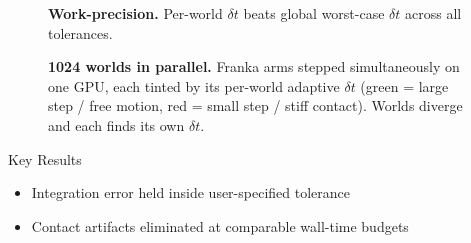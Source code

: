 \documentclass[final]{beamer}
\newlength{\onecolwid}
\begin{document}
\begin{frame}[t]
\begin{columns}[t]
\begin{column}{\onecolwid}

\begin{figure}
\centering
{}
\caption{\textbf{Work-precision.} Per-world $\delta t$ beats global
worst-case $\delta t$ across all tolerances.}
\end{figure}

\begin{figure}
\centering
{}
\caption{\textbf{1024 worlds in parallel.} Franka arms stepped
simultaneously on one GPU, each tinted by its per-world adaptive
$\delta t$ (green = large step / free motion, red = small step /
stiff contact). Worlds diverge and each finds its own $\delta t$.}
\end{figure}

\begin{block}{Key Results}
\begin{itemize}
\item Integration error held inside user-specified tolerance
\item Contact artifacts eliminated at comparable wall-time budgets
\end{itemize}
\end{block}



\end{column}

\end{columns}
\end{frame}
\end{document}
